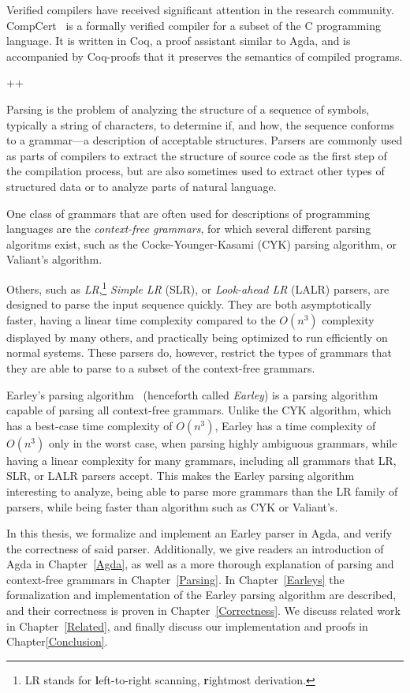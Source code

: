 	Verified compilers have received significant attention in the research
	community. CompCert~\cite{Leroy} is a formally verified compiler for a
	subset of the C programming language. It is written in Coq, a proof
	assistant similar to Agda, and is accompanied by Coq-proofs that it
	preserves the semantics of compiled programs.

	++

	Parsing is the problem of analyzing the structure of a sequence of
	symbols, typically a string of characters, to determine if, and how, the
	sequence conforms to a grammar---a description of acceptable structures.
	Parsers are commonly used as parts of compilers to extract the structure of
	source code as the first step of the compilation process, but are also
	sometimes used to extract other types of structured data or to analyze
	parts of natural language.

	One class of grammars that are often used for descriptions of programming
	languages are the \emph{context-free grammars}, for which several different
	parsing algoritms exist, such as the Cocke-Younger-Kasami (CYK) parsing
	algorithm, or Valiant's algorithm.
	
	Others, such as \emph{LR},\footnote{LR stands for \textbf{l}eft-to-right
	scanning, \textbf{r}ightmost derivation.} \emph{Simple LR} (SLR), or
	\emph{Look-ahead LR} (LALR) parsers, are designed to parse the input
	sequence quickly. They are both asymptotically faster, having a linear time
	complexity compared to the $O(n^3)$ complexity displayed by many others,
	and practically being optimized to run efficiently on normal systems.
	These parsers do, however, restrict the types of grammars that they are
	able to parse to a subset of the context-free grammars.

	Earley's parsing algorithm~\cite{Earley} (henceforth called \emph{Earley})
	is a parsing algorithm capable of parsing all context-free grammars. Unlike
	the CYK algorithm, which has a best-case time complexity of $O(n^3)$,
	Earley has a time complexity of $O(n^3)$ only in the worst case, when
	parsing highly ambiguous grammars, while having a linear complexity for
	many grammars, including all grammars that LR, SLR, or LALR parsers accept.
	This makes the Earley parsing algorithm interesting to analyze, being able
	to parse more grammars than the LR family of parsers, while being faster
	than algorithm such as CYK or Valiant's.

	In this thesis, we formalize and implement an Earley parser in Agda, and
	verify the correctness of said parser. Additionally, we give readers an
	introduction of Agda in Chapter~\ref{Agda}, as well as a more thorough
	explanation of parsing and context-free grammars in Chapter~\ref{Parsing}.
	In Chapter~\ref{Earleys} the formalization and implementation of the Earley
	parsing algorithm are described, and their correctness is proven in
	Chapter~\ref{Correctness}. We discuss related work in
	Chapter~\ref{Related}, and finally discuss our implementation and proofs in
	Chapter\ref{Conclusion}.

